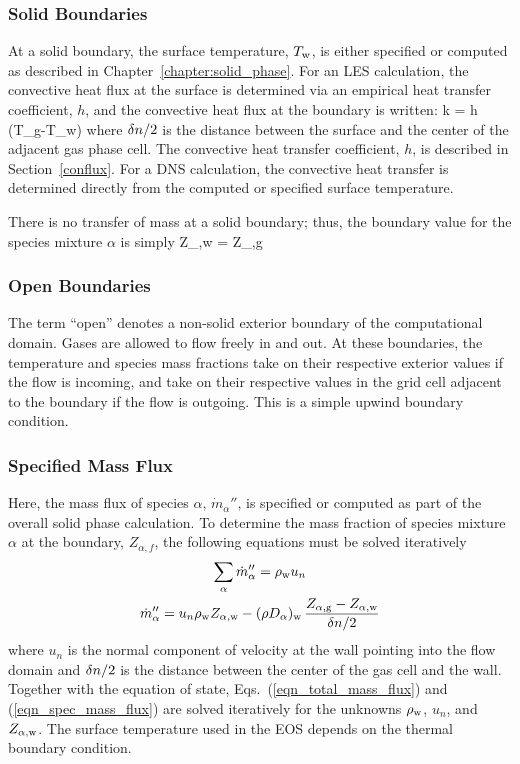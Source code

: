 \subsubsection{Solid Boundaries}

At a solid boundary, the surface temperature, $T_{\rm w}$, is either specified or computed as described in Chapter~\ref{chapter:solid_phase}. For an LES calculation, the convective heat flux at the surface is determined via an empirical heat transfer coefficient, $h$, and the convective heat flux at the boundary is written:
\be
   k  = h \; (T_{\rm g}-T_{\rm w})  \label{ebal}
\ee
where $\delta n/2$ is the distance between the surface and the center of the adjacent gas phase cell. The convective heat transfer coefficient, $h$, is described in Section~\ref{conflux}. For a DNS calculation, the convective heat transfer is determined directly from the computed or specified surface temperature.

There is no transfer of mass at a solid boundary; thus, the boundary value for the species mixture $\alpha$ is simply
\be Z_{\rm \alpha,w} = Z_{\rm \alpha,g} \ee

\subsubsection{Open Boundaries}

The term ``open'' denotes a non-solid exterior boundary of the computational domain. Gases are allowed to flow freely in and out. At these boundaries, the temperature and species mass fractions take on their respective exterior values if the flow is incoming, and take on their respective values in the grid cell adjacent to the boundary if the flow is outgoing. This is a simple upwind boundary condition.



\subsubsection{Specified Mass Flux}

Here, the mass flux of species $\alpha$, $\dot{m}_\alpha''$, is specified or computed as part of the overall solid phase calculation. To determine the mass fraction of species mixture $\alpha$ at the boundary, $Z_{\alpha,f}$, the following equations must be solved iteratively
\begin{gather}
\label{eqn_total_mass_flux} \sum_\alpha \dot{m}_\alpha'' = \rho_{\rm w} u_n \\
\label{eqn_spec_mass_flux}  \dot{m}_\alpha'' = u_n \rho_{\rm w} Z_{\rm \alpha,w} - (\rho D_\alpha)_{\rm w} \, \frac{Z_{\rm \alpha,g}-Z_{\rm \alpha,w}}{\delta n/2}
\end{gather}
where $u_n$ is the normal component of velocity at the wall pointing into the flow domain and $\delta n/2$ is the distance between the center of the gas cell and the wall. Together with the equation of state, Eqs.~(\ref{eqn_total_mass_flux}) and (\ref{eqn_spec_mass_flux}) are solved iteratively for the unknowns $\rho_{\rm w}$, $u_n$, and $Z_{\rm \alpha,w}$.  The surface temperature used in the EOS depends on the thermal boundary condition.


